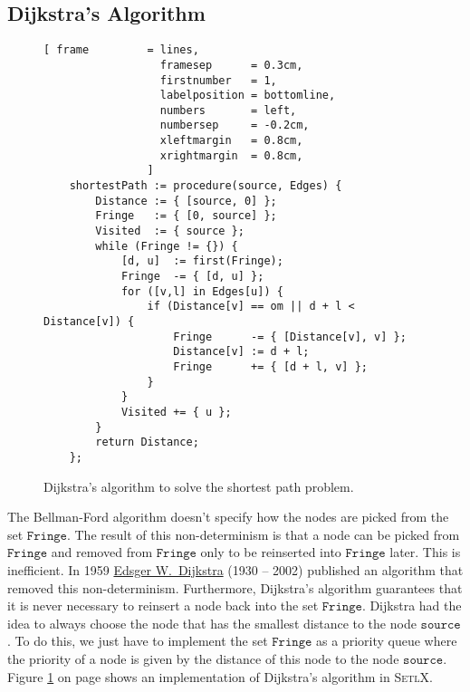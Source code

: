 \subsection{Dijkstra's Algorithm \label{sec:dijkstra}}
\begin{figure}[!ht]
\centering
\begin{Verbatim}[ frame         = lines, 
                  framesep      = 0.3cm, 
                  firstnumber   = 1,
                  labelposition = bottomline,
                  numbers       = left,
                  numbersep     = -0.2cm,
                  xleftmargin   = 0.8cm,
                  xrightmargin  = 0.8cm,
                ]
    shortestPath := procedure(source, Edges) {
        Distance := { [source, 0] };
        Fringe   := { [0, source] };
        Visited  := { source };
        while (Fringe != {}) {
            [d, u]  := first(Fringe);
            Fringe  -= { [d, u] };
            for ([v,l] in Edges[u]) {
                if (Distance[v] == om || d + l < Distance[v]) {
                    Fringe      -= { [Distance[v], v] };
                    Distance[v] := d + l;
                    Fringe      += { [d + l, v] };
                }
            }
            Visited += { u };
        }
        return Distance;
    };
\end{Verbatim}
\vspace*{-0.3cm}
\caption{Dijkstra's algorithm to solve the shortest path problem.}
\label{fig:dijkstra.stlx}
\end{figure}

\noindent
The Bellman-Ford algorithm doesn't specify how the nodes are picked from the set $\texttt{Fringe}$.
The result of this non-determinism is that a node can be picked from $\texttt{Fringe}$ and removed from
$\texttt{Fringe}$ only to be reinserted into $\texttt{Fringe}$ later.  This is inefficient.
In 1959 \href{https://en.wikipedia.org/wiki/Edsger_W._Dijkstra}{Edsger W.~Dijkstra} (1930 -- 2002) \cite{dijkstra:59}
published an algorithm that removed this non-determinism.  Furthermore, Dijkstra's algorithm guarantees that it
is never necessary to reinsert a node back into the set $\texttt{Fringe}$.  Dijkstra had the idea to always choose
the node that has the smallest distance to the node $\texttt{source}$.  To do this, we just have to
implement the set  $\texttt{Fringe}$ as a priority queue where the priority of a node is given by the
distance of this node to the node $\texttt{source}$.  Figure \ref{fig:dijkstra.stlx} on page
\pageref{fig:dijkstra.stlx} shows an implementation of Dijkstra's algorithm in \textsc{SetlX}.

